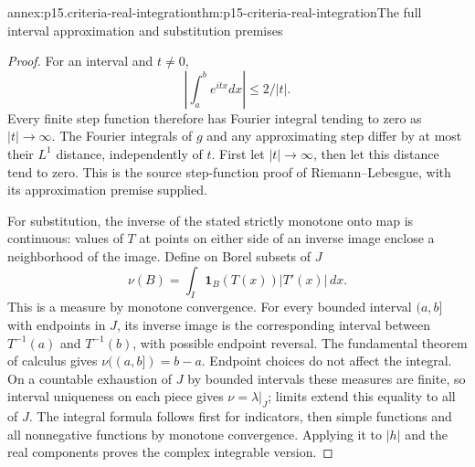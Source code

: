 \begin{annexitem}{annex:p15.criteria-real-integration}{thm:p15-criteria-real-integration}{The full interval approximation and substitution premises}
\begin{proof}
For an interval and \(t\ne0\),
\[
 \left|\int_a^b e^{itx}dx\right|\leq2/|t|.
\]
Every finite step function therefore has Fourier integral
tending to zero as \(|t|\to\infty\).
The Fourier integrals of \(g\) and any approximating step
differ by at most their \(L^1\) distance, independently of
\(t\). First let \(|t|\to\infty\), then let this distance
tend to zero. This is the source step-function proof of
Riemann--Lebesgue, with its approximation premise supplied.

For substitution, the inverse of the stated strictly
monotone onto map is continuous: values of \(T\) at
points on either side of an inverse image enclose a
neighborhood of the image. Define on Borel subsets of \(J\)
\[
 \nu(B)=\int_I\mathbf1_B(T(x))|T'(x)|\,dx.
\]
This is a measure by monotone convergence.
For every bounded interval \((a,b]\) with endpoints in \(J\),
its inverse image is the corresponding interval between
\(T^{-1}(a)\) and \(T^{-1}(b)\), with possible endpoint
reversal. The fundamental theorem of calculus gives
\(\nu((a,b])=b-a\).
Endpoint choices do not affect the integral.
On a countable exhaustion of \(J\) by bounded intervals
these measures are finite, so interval uniqueness on each
piece gives \(\nu=\lambda|_J\); limits extend this equality
to all of \(J\).
The integral formula follows first for indicators, then
simple functions and all nonnegative functions by monotone
convergence. Applying it to \(|h|\) and the real components
proves the complex integrable version.
\end{proof}
\end{annexitem}

